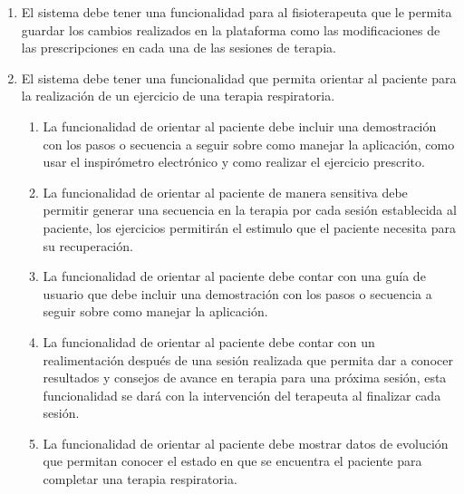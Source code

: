 \documentclass[12pt]{article}
\begin{document}
\begin{enumerate}[start=1,label={\bfseries RF0\arabic*.}]
    
    \item El sistema debe tener una funcionalidad para al fisioterapeuta que le permita guardar los cambios realizados en la plataforma como las modificaciones de las prescripciones en cada una de las sesiones de terapia.
    
    
    
            

    \item El sistema debe tener una funcionalidad que permita orientar al paciente  para la realización de un ejercicio de una terapia respiratoria. 
    \label{RF08}
            \begin{enumerate}[label*=\arabic*.]
            
                \item La funcionalidad de orientar al paciente debe incluir una demostración con los pasos o secuencia a seguir sobre como manejar la aplicación, como usar el inspirómetro electrónico y como realizar el ejercicio prescrito.
                
                \item La funcionalidad de orientar al paciente de manera sensitiva debe permitir generar una secuencia en la terapia por cada sesión establecida al paciente, los ejercicios permitirán el estimulo que el paciente  necesita para su recuperación. %
                
                \item La funcionalidad de orientar al paciente debe contar con una guía de usuario que debe incluir una demostración con los pasos o secuencia a seguir sobre como manejar la aplicación.
                
                \item La funcionalidad de orientar al paciente debe contar con un realimentación después de una sesión realizada que permita dar a conocer resultados y consejos de avance en terapia para una próxima sesión, esta funcionalidad se dará con la intervención del terapeuta al finalizar cada sesión.
    
                \item La funcionalidad de orientar al paciente debe mostrar datos de evolución que permitan conocer el estado en que se encuentra el paciente para completar una terapia respiratoria.
                

\end{enumerate}
\end{enumerate}
\end{document}
